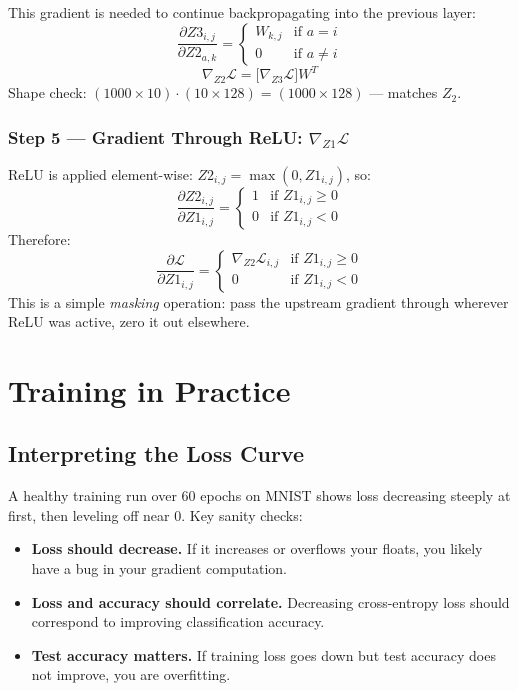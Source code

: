 \documentclass[12pt]{article}
\begin{document}
This gradient is needed to continue backpropagating into the previous layer:
\[
\frac{\partial Z3_{i,j}}{\partial Z2_{a,k}} = \begin{cases} W_{k,j} & \text{if } a = i \\ 0 & \text{if } a \neq i \end{cases}
\]
\[
\boxed{\nabla_{Z2}\mathcal{L} = \big[\nabla_{Z3}\mathcal{L}\big] W^T}
\]
Shape check: $(1000 \times 10) \cdot (10 \times 128) = (1000 \times 128)$ --- matches $Z_2$.

\subsubsection{Step 5 --- Gradient Through ReLU: $\nabla_{Z1}\mathcal{L}$}

ReLU is applied element-wise: $Z2_{i,j} = \max(0, Z1_{i,j})$, so:
\[
\frac{\partial Z2_{i,j}}{\partial Z1_{i,j}} = \begin{cases} 1 & \text{if } Z1_{i,j} \geq 0 \\ 0 & \text{if } Z1_{i,j} < 0 \end{cases}
\]
Therefore:
\[
\boxed{\frac{\partial \mathcal{L}}{\partial Z1_{i,j}} = \begin{cases} \nabla_{Z2}\mathcal{L}_{i,j} & \text{if } Z1_{i,j} \geq 0 \\ 0 & \text{if } Z1_{i,j} < 0 \end{cases}}
\]
This is a simple \emph{masking} operation: pass the upstream gradient through wherever ReLU was active, zero it out elsewhere.

\section{Training in Practice}

\subsection{Interpreting the Loss Curve}

A healthy training run over 60 epochs on MNIST shows loss decreasing steeply at first,
then leveling off near 0. Key sanity checks:

\begin{itemize}
  \item \textbf{Loss should decrease.} If it increases or overflows your floats, you likely have a bug in your gradient computation.
  \item \textbf{Loss and accuracy should correlate.} Decreasing cross-entropy loss should correspond to improving classification accuracy.
  \item \textbf{Test accuracy matters.} If training loss goes down but test accuracy does not improve, you are overfitting.
\end{itemize}
\end{document}
